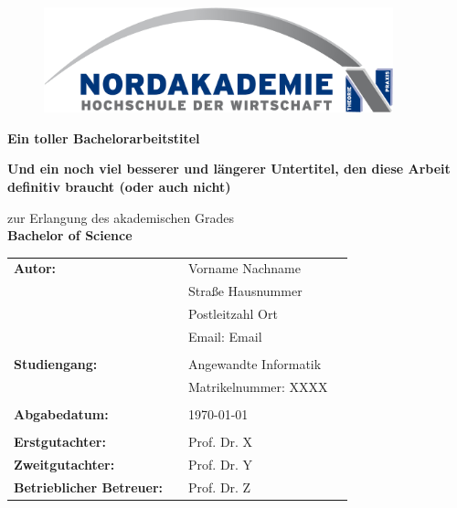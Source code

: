 \thispagestyle{empty}

\vspace{1.5cm}

\begin{figure}[h]
    \centering
    \includegraphics[width=0.9\textwidth]{dokumente/bilder/Nordakademie_Logo_gross.jpg}
\end{figure}

\vspace{2.5cm}

\begin{center}
    \textbf{\Huge{Ein toller Bachelorarbeitstitel}}

    \textbf{\Large{Und ein noch viel besserer und längerer Untertitel, den diese Arbeit definitiv braucht (oder auch nicht)}}
\end{center}

\vspace{1.5cm}

\begin{center}
    zur Erlangung des akademischen Grades\\
    \textbf{\large{Bachelor of Science}}
\end{center}

\vspace{4.0cm}

\begin{flushleft}
    \begin{tabular}{llll}
        \textbf{Autor:} & & Vorname Nachname & \\
        & & Straße Hausnummer & \\
        & & Postleitzahl Ort & \\
        & & Email: Email & \\
        & & \\
        \textbf{Studiengang:} & & Angewandte Informatik & \\
        & & Matrikelnummer: XXXX & \\ 
        & & \\
        \textbf{Abgabedatum:} & & \today &\\
        & & \\
        \textbf{Erstgutachter:} & & Prof. Dr. X &\\
        \textbf{Zweitgutachter:} & & Prof. Dr. Y &\\
        \textbf{Betrieblicher Betreuer:} & & Prof. Dr. Z &\\
    \end{tabular}
\end{flushleft}

\pagebreak